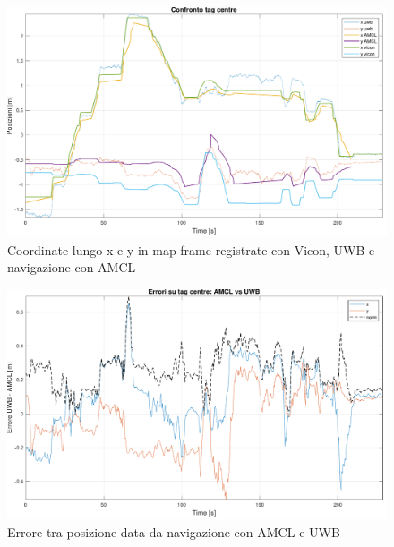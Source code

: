 \begin{figure}[] 
	\centering    
	\includegraphics[height=.3\textheight]{grafici_stanzavolo_vicon/figure4.pdf}
	\caption{Coordinate lungo x e y in map frame registrate con Vicon, UWB e navigazione con AMCL}
	\label{fig: assixy_vicon_charlie}
\end{figure}

\begin{figure}[] 
	\centering    
	\includegraphics[height=.3\textheight]{grafici_stanzavolo_vicon/figure12.pdf}
	\caption{Errore tra posizione data da navigazione con AMCL e UWB}
	\label{fig: amcluwb_err_vicon_charlie}
\end{figure}

